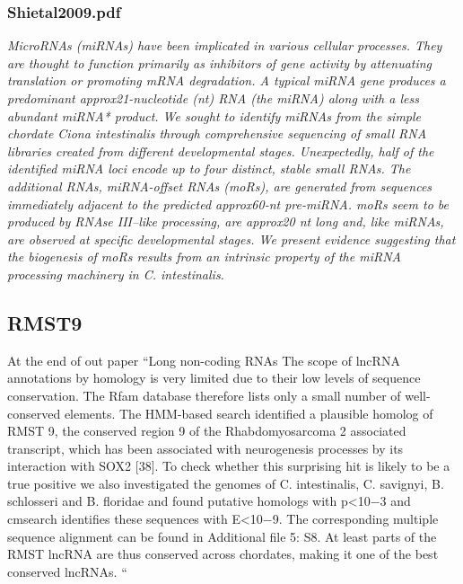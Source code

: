 \documentclass[graybox]{svmult}
\begin{document}
\subsubsection{Shietal2009.pdf}

\cite{Shi2009}
\textit{MicroRNAs (miRNAs) have been implicated in various cellular processes. They are thought to function primarily as inhibitors of gene activity by attenuating translation or promoting mRNA degradation. A typical miRNA gene produces a predominant approx21-nucleotide (nt) RNA (the miRNA) along with a less abundant miRNA* product. We sought to identify miRNAs from the simple chordate Ciona intestinalis through comprehensive sequencing of small RNA libraries created from different developmental stages. Unexpectedly, half of the identified miRNA loci encode up to four distinct, stable small RNAs. The additional RNAs, miRNA-offset RNAs (moRs), are generated from sequences immediately adjacent to the predicted approx60-nt pre-miRNA. moRs seem to be produced by RNAse III–like processing, are approx20 nt long and, like miRNAs, are observed at specific developmental stages. We present evidence suggesting that the biogenesis of moRs results from an intrinsic property of the miRNA processing machinery in C. intestinalis.}

\subsection{RMST9}
At the end of out paper “Long non-coding RNAs
The scope of lncRNA annotations by homology is very limited due to their low levels of sequence conservation. The Rfam database therefore lists only a small number of well-conserved elements. The HMM-based search identified a plausible homolog of RMST 9, the conserved region 9 of the Rhabdomyosarcoma 2 associated transcript, which has been associated with neurogenesis processes by its interaction with SOX2 [38]. To check whether this surprising hit is likely to be a true positive we also investigated the genomes of C. intestinalis, C. savignyi, B. schlosseri and B. floridae and found putative homologs with p<10−3 and cmsearch identifies these sequences with E<10−9. The corresponding multiple sequence alignment can be found in Additional file 5: S8. At least parts of the RMST lncRNA are thus conserved across chordates, making it one of the best conserved lncRNAs.
“
\end{document}
